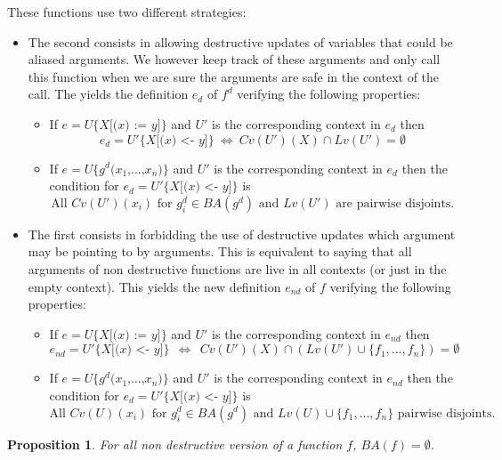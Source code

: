 \documentclass[12pt,a4paper]{article}
\newcommand{\cl}[1]{\texttt{#1}}
\newtheorem{proposition}[theorem]{Proposition}
\newcommand{\ucont}[1]{\{#1\}}
\begin{document}
These functions use two different strategies:
\begin{itemize}
\item The second consists in allowing destructive updates of variables that could be aliased arguments. We however keep track of these arguments and only call this function when we are sure the arguments are safe in the context of the call. 
The yields the definition $e_d$ of $f^d$ verifying the following properties:
\begin{itemize}
\item If $e = U\ucont{X\cl{[(}x \cl{) := } y \cl{]}}$ and $U'$ is the corresponding context in $e_d$ then
$$ e_d = U'\ucont{X\cl{[(}x \cl{) <- } y \cl{]}} \ \Longleftrightarrow \ Cv(U')(X) \cap Lv(U') = \emptyset $$
\item If $e = U\ucont{g^d\cl{(}x_1 \cl{,} ... \cl{,} x_n \cl{)}}$ and $U'$ is the corresponding context in $e_d$ then the condition for $e_d = U'\ucont{X\cl{[(}x \cl{) <- } y \cl{]}}$ is
$$ \text{All } Cv(U')(x_i) \text{ for } g_i^d \in BA(g^d) \text{ and } Lv(U') \text{ are pairwise disjoints.} $$
\end{itemize}
\item The first consists in forbidding the use of destructive updates which argument may be pointing to by arguments. This is equivalent to saying that all arguments of non destructive functions are live in all contexts (or just in the empty context).
This yields the new definition $e_{nd}$ of $f$ verifying the following properties:
\begin{itemize}
\item If $e = U\ucont{X\cl{[(}x \cl{) := } y \cl{]}}$ and $U'$ is the corresponding context in $e_{nd}$ then
$$ e_{nd} = U'\ucont{X\cl{[(}x \cl{) <- } y \cl{]}} \ \ \Longleftrightarrow \ \  Cv(U')(X) \cap \left( Lv(U') \cup \{f_1, ... , f_n \} \right) = \emptyset $$
\item If $e = U\ucont{g^d\cl{(}x_1 \cl{,} ... \cl{,} x_n \cl{)}}$ and $U'$ is the corresponding context in $e_{nd}$ then the condition for $e_d = U'\ucont{X\cl{[(}x \cl{) <- } y \cl{]}}$ is
$$ \text{All  } Cv(U)(x_i) \text{ for } g^d_i \in BA(g^d) \text{ and } Lv(U) \cup \{f_1, ... , f_n \} \text{ pairwise disjoints.}  $$
\end{itemize}
\end{itemize}
\begin{proposition}
For all non destructive version of a function $f$, $ BA(f) = \emptyset$.
\end{proposition}
\end{document}
